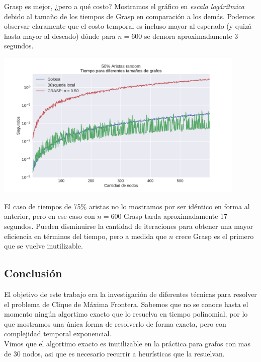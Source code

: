 Grasp es mejor, ¿pero a qué costo? Mostramos el gráfico en \textit{escala logárítmica} debido al tamaño de los tiempos de Grasp en comparación a los demás. Podemos observar claramente que el costo temporal es incluso mayor al esperado (y quizá hasta mayor al deseado) dónde para $n = 600$ se demora aproximadamente 3 segundos.

{\centering
    \includegraphics[width=0.9\textwidth]{informe/imgs/exp_random50_tiempo_todos_ngrande_logy.pdf}
}

El caso de tiempos de 75\% aristas no lo mostramos por ser idéntico en forma al anterior, pero en ese caso con $n = 600$ Grasp tarda aproximadamente 17 segundos. Pueden disminuirse la cantidad de iteraciones para obtener una mayor eficiencia en términos del tiempo, pero a medida que $n$ crece Grasp es el primero que se vuelve inutilizable.



\subsection{Conclusión}

El objetivo de este trabajo era la investigación de diferentes técnicas para resolver el problema de Clique de Máxima Frontera. Sabemos que no se conoce hasta el momento ningún algortimo exacto que lo resuelva en tiempo polinomial, por lo que mostramos una única forma de resolverlo de forma exacta, pero con complejidad temporal exponencial. \\

Vimos que el algortimo exacto es inutilizable en la práctica para grafos con mas de 30 nodos, asi que es necesario recurrir a heurísticas que la resuelvan. \\

